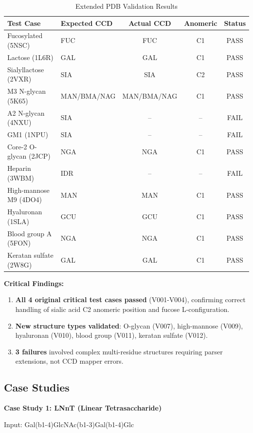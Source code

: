 \documentclass[11pt,a4paper]{article}
\begin{document}
\begin{table}[h]
\centering
\caption{Extended PDB Validation Results}
\begin{tabular}{llccc}
\toprule
Test Case & Expected CCD & Actual CCD & Anomeric & Status \\
\midrule
Fucosylated (5NSC) & FUC & FUC & C1 & PASS \\
Lactose (1L6R) & GAL & GAL & C1 & PASS \\
Sialyllactose (2VXR) & SIA & SIA & C2 & PASS \\
M3 N-glycan (5K65) & MAN/BMA/NAG & MAN/BMA/NAG & C1 & PASS \\
A2 N-glycan (4NXU) & SIA & -- & -- & FAIL \\
GM1 (1NPU) & SIA & -- & -- & FAIL \\
Core-2 O-glycan (2JCP) & NGA & NGA & C1 & PASS \\
Heparin (3WBM) & IDR & -- & -- & FAIL \\
High-mannose M9 (4DO4) & MAN & MAN & C1 & PASS \\
Hyaluronan (1SLA) & GCU & GCU & C1 & PASS \\
Blood group A (5FON) & NGA & NGA & C1 & PASS \\
Keratan sulfate (2W8G) & GAL & GAL & C1 & PASS \\
\bottomrule
\end{tabular}
\label{tab:pdb_results}
\end{table}

\textbf{Critical Findings:}
\begin{enumerate}
\item \textbf{All 4 original critical test cases passed} (V001-V004), confirming correct handling of sialic acid C2 anomeric position and fucose L-configuration.
\item \textbf{New structure types validated}: O-glycan (V007), high-mannose (V009), hyaluronan (V010), blood group (V011), keratan sulfate (V012).
\item \textbf{3 failures} involved complex multi-residue structures requiring parser extensions, not CCD mapper errors.
\end{enumerate}

\subsection{Case Studies}

\textbf{Case Study 1: LNnT (Linear Tetrasaccharide)}

Input: Gal(b1-4)GlcNAc(b1-3)Gal(b1-4)Glc
\end{document}
